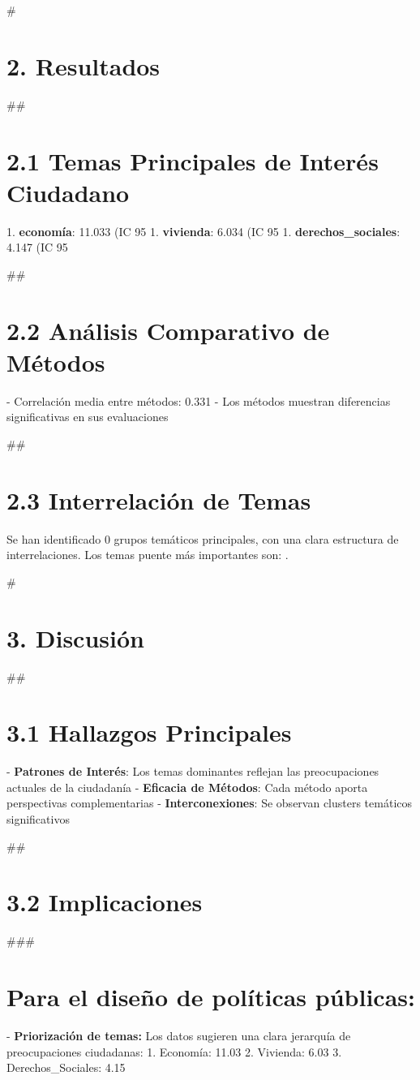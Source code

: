 \documentclass[12pt,a4paper]{article}
\begin{document}
            #\section{2. Resultados}

            ##\section{2.1 Temas Principales de Interés Ciudadano}
            1. \textbf{economía}: 11.033 (IC 95%
1. \textbf{vivienda}: 6.034 (IC 95%
1. \textbf{derechos_sociales}: 4.147 (IC 95%

            ##\section{2.2 Análisis Comparativo de Métodos}
            - Correlación media entre métodos: 0.331
            - Los métodos muestran diferencias significativas en sus evaluaciones

            ##\section{2.3 Interrelación de Temas}
            Se han identificado 0 grupos temáticos principales, con una clara estructura de interrelaciones.
            Los temas puente más importantes son: .

            #\section{3. Discusión}

            ##\section{3.1 Hallazgos Principales}
            - \textbf{Patrones de Interés}: Los temas dominantes reflejan las preocupaciones actuales de la ciudadanía
            - \textbf{Eficacia de Métodos}: Cada método aporta perspectivas complementarias
            - \textbf{Interconexiones}: Se observan clusters temáticos significativos
            
            
            ##\section{3.2 Implicaciones}

            ###\section{Para el diseño de políticas públicas:}
            - \textbf{Priorización de temas:} Los datos sugieren una clara jerarquía de preocupaciones ciudadanas:  1. Economía: 11.03
  2. Vivienda: 6.03
  3. Derechos_Sociales: 4.15
\end{document}
